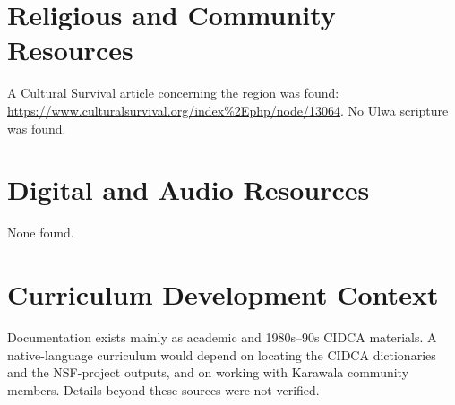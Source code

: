 \documentclass[12pt]{article}
\begin{document}
\section{Religious and Community Resources}
A Cultural Survival article concerning the region was found: \url{https://www.culturalsurvival.org/index%2Ephp/node/13064}. No Ulwa scripture was found.

\section{Digital and Audio Resources}
None found.

\section{Curriculum Development Context}
Documentation exists mainly as academic and 1980s--90s CIDCA materials. A native-language curriculum would depend on locating the CIDCA dictionaries and the NSF-project outputs, and on working with Karawala community members. Details beyond these sources were not verified.
\end{document}
